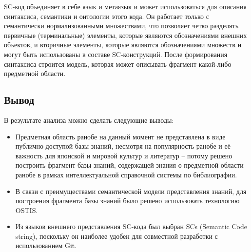 SC-код объединяет в себе язык и метаязык и может использоваться для описания синтаксиса, семантики и онтологии этого кода. Он работает только с семантически нормализованными множествами, что позволяет четко разделять первичные (терминальные) элементы, которые являются обозначениями внешних объектов, и вторичные элементы, которые являются обозначениями множеств и могут быть использованы в составе SC-конструкций. После формирования синтаксиса строится модель, которая может описывать фрагмент какой-либо предметной области. \cite[с~116-117]{OSTIS}

\subsection{Вывод}
В результате анализа можно сделать следующие выводы:

\begin{itemize}
    \item Предметная область ранобе на данный момент не представлена в виде публично доступой базы знаний, несмотря на популярность ранобе и её важность для японской и мировой культур и литератур -- потому решено построить фрагмент базы знаний, содержащей знания о предметной области ранобе в рамках интеллектуальной справочной системы по библиографии.
    \item В связи с преимуществами семантической модели представления знаний, для построения фрагмента базы знаний было решено использовать технологию OSTIS.
    \item Из языков внешнего представления SC-кода был выбран SCs (Semantic Code string), поскольку он наиболее удобен для совместной разработки с использованием Git.
\end{itemize}
